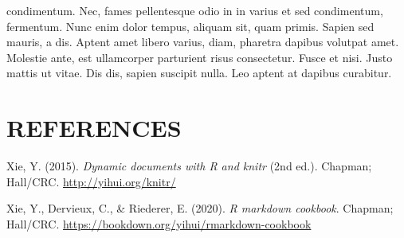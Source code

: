 \documentclass{source/tex/templates/maththesis}
\newlength{\cslhangindent}
\newenvironment{CSLReferences}[2] %
 {%
  \setlength{\parindent}{0pt}
  \ifodd #1
  \let\oldpar\par
  \def\par{\hangindent=\cslhangindent\oldpar}
  \fi
  \setlength{\parskip}{1mm}
  \setlength{\baselineskip}{6mm}
 }%
 {}
\begin{document}
condimentum. Nec, fames pellentesque odio in in varius et sed condimentum, fermentum. Nunc enim dolor tempus, aliquam sit, quam primis. Sapien sed mauris, a dis. Aptent amet libero varius, diam, pharetra dapibus volutpat amet. Molestie ante, est ullamcorper parturient risus consectetur. Fusce et nisi. Justo mattis ut vitae. Dis dis, sapien suscipit nulla. Leo aptent at dapibus curabitur.

\hypertarget{references}{%
\chapter*{REFERENCES}\label{references}}

\hypertarget{refs}{}
\begin{CSLReferences}{1}{0}
\leavevmode{}%
Xie, Y. (2015). \emph{Dynamic documents with {R} and knitr} (2nd ed.). Chapman; Hall/CRC. \url{http://yihui.org/knitr/}

\leavevmode{}%
Xie, Y., Dervieux, C., \& Riederer, E. (2020). \emph{R markdown cookbook}. Chapman; Hall/CRC. \url{https://bookdown.org/yihui/rmarkdown-cookbook}

\end{CSLReferences}

\end{document}
